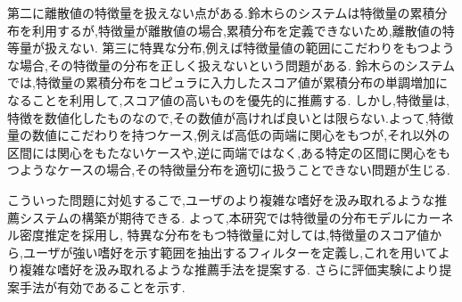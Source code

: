 第二に離散値の特徴量を扱えない点がある.鈴木らのシステムは特徴量の累積分布を利用するが,特徴量が離散値の場合,累積分布を定義できないため,離散値の特等量が扱えない.
第三に特異な分布,例えば特徴量値の範囲にこだわりをもつような場合,その特徴量の分布を正しく扱えないという問題がある.
鈴木らのシステムでは,特徴量の累積分布をコピュラに入力したスコア値が累積分布の単調増加になることを利用して,スコア値の高いものを優先的に推薦する.
しかし,特徴量は,特徴を数値化したものなので,その数値が高ければ良いとは限らない.よって,特徴量の数値にこだわりを持つケース,例えば高低の両端に関心をもつが,それ以外の区間には関心をもたないケースや,逆に両端ではなく,ある特定の区間に関心をもつようなケースの場合,その特徴量分布を適切に扱うことできない問題が生じる.\par
こういった問題に対処するこで,ユーザのより複雑な嗜好を汲み取れるような推薦システムの構築が期待できる.
よって,本研究では特徴量の分布モデルにカーネル密度推定を採用し,
特異な分布をもつ特徴量に対しては,特徴量のスコア値から,ユーザが強い嗜好を示す範囲を抽出するフィルターを定義し,これを用いてより複雑な嗜好を汲み取れるような推薦手法を提案する.
さらに評価実験により提案手法が有効であることを示す.
